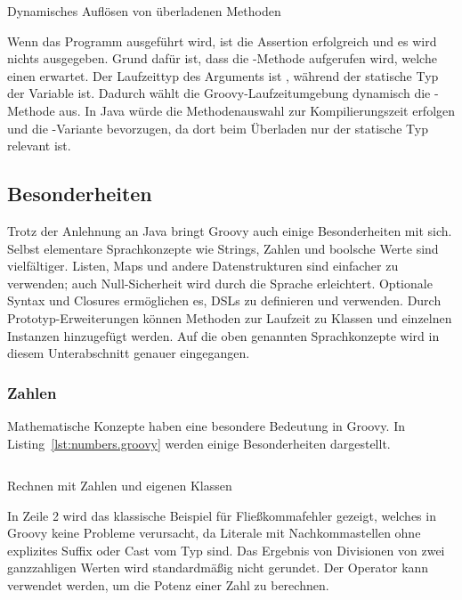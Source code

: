 \documentclass[a4paper]{article}
\newcommand{\codelisting}[3]{
\begin{listing}[ht]
	\inputminted{#1}{#1/#2}
	\vspace{-3ex}
	\caption{#3}
	\label{lst:#2}
\end{listing}
}
\begin{document}
\codelisting{groovy}{multi-methods.groovy}{Dynamisches Auflösen von überladenen Methoden}

Wenn das Programm ausgeführt wird, ist die Assertion erfolgreich und es wird nichts ausgegeben.
Grund dafür ist, dass die -Methode aufgerufen wird, welche einen  erwartet.
Der Laufzeittyp des Arguments  ist , während der statische Typ der Variable  ist.
Dadurch wählt die Groovy-Laufzeitumgebung dynamisch die -Methode aus.
In Java würde die Methodenauswahl zur Kompilierungszeit erfolgen und die -Variante bevorzugen, da dort beim Überladen nur der statische Typ relevant ist.

\subsection{Besonderheiten}\label{subsec:besonderheiten}

Trotz der Anlehnung an Java bringt Groovy auch einige Besonderheiten mit sich.
Selbst elementare Sprachkonzepte wie Strings, Zahlen und boolsche Werte sind vielfältiger.
Listen, Maps und andere Datenstrukturen sind einfacher zu verwenden; auch Null-Sicherheit wird durch die Sprache erleichtert.
Optionale Syntax und Closures ermöglichen es, DSLs zu definieren und verwenden.
Durch Prototyp-Erweiterungen können Methoden zur Laufzeit zu Klassen und einzelnen Instanzen hinzugefügt werden.
Auf die oben genannten Sprachkonzepte wird in diesem Unterabschnitt genauer eingegangen.

\subsubsection{Zahlen}\label{subsubsec:zahlen}

Mathematische Konzepte haben eine besondere Bedeutung in Groovy.
In Listing~\ref{lst:numbers.groovy} werden einige Besonderheiten dargestellt.

\codelisting{groovy}{numbers.groovy}{Rechnen mit Zahlen und eigenen Klassen}

In Zeile 2 wird das klassische Beispiel für Fließkommafehler gezeigt, welches in Groovy keine Probleme verursacht, da Literale mit Nachkommastellen ohne explizites Suffix oder Cast vom Typ  sind.
Das Ergebnis von Divisionen von zwei ganzzahligen Werten wird standardmäßig nicht gerundet.
Der Operator \code{**} kann verwendet werden, um die Potenz einer Zahl zu berechnen.
\end{document}
